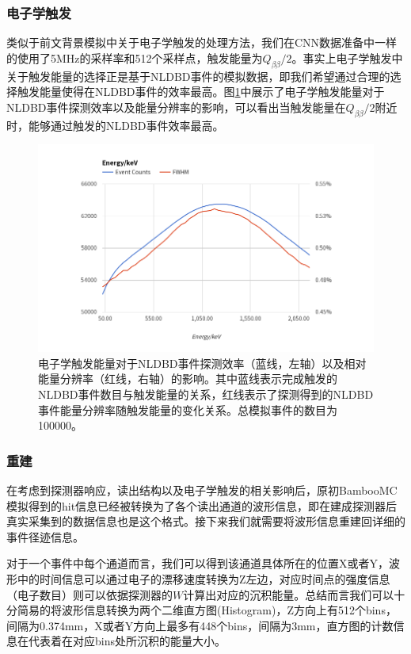 \subsubsection{电子学触发}
    类似于前文背景模拟中关于电子学触发的处理方法，我们在CNN数据准备中一样的使用了5MHz的采样率和512个采样点，触发能量为$Q_{\beta\beta}/2$。事实上电子学触发中关于触发能量的选择正是基于NLDBD事件的模拟数据，即我们希望通过合理的选择触发能量使得在NLDBD事件的效率最高。图\ref{fig:trigger_select}中展示了电子学触发能量对于NLDBD事件探测效率以及能量分辨率的影响，可以看出当触发能量在$Q_{\beta\beta}/2$附近时，能够通过触发的NLDBD事件效率最高。

    \begin{figure}
        \centering
        \includegraphics[width=0.8\columnwidth]{pic/trigger_select.png}
        \caption{电子学触发能量对于NLDBD事件探测效率（蓝线，左轴）以及相对能量分辨率（红线，右轴）的影响。其中蓝线表示完成触发的NLDBD事件数目与触发能量的关系，红线表示了探测得到的NLDBD事件能量分辨率随触发能量的变化关系。总模拟事件的数目为100000。}
        \label{fig:trigger_select}
    \end{figure}

\subsubsection{重建}

    在考虑到探测器响应，读出结构以及电子学触发的相关影响后，原初BambooMC模拟得到的hit信息已经被转换为了各个读出通道的波形信息，即在建成探测器后真实采集到的数据信息也是这个格式。接下来我们就需要将波形信息重建回详细的事件径迹信息。

    对于一个事件中每个通道而言，我们可以得到该通道具体所在的位置X或者Y，波形中的时间信息可以通过电子的漂移速度转换为Z左边，对应时间点的强度信息（电子数目）则可以依据探测器的$W$计算出对应的沉积能量。总结而言我们可以十分简易的将波形信息转换为两个二维直方图(Histogram)，Z方向上有512个bins，间隔为0.374mm，X或者Y方向上最多有448个bins，间隔为3mm，直方图的计数信息在代表着在对应bins处所沉积的能量大小。

